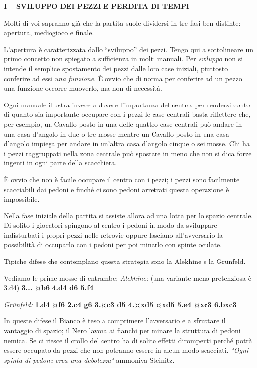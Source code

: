 \textbf{I -- SVILUPPO DEI PEZZI E PERDITA DI TEMPI}

Molti di voi sapranno già che la partita suole dividersi in tre fasi ben
distinte: apertura, mediogioco e finale.

L'apertura è caratterizzata dallo ``sviluppo'' dei pezzi. Tengo qui a
sottolineare un primo concetto non spiegato a sufficienza in molti
manuali. Per \emph{sviluppo} non si intende il semplice spostamento dei
pezzi dalle loro case iniziali, piuttosto conferire ad essi \emph{una
funzione}. È ovvio che di norma per conferire ad un pezzo una funzione
occorre muoverlo, ma non di necessità.

Ogni manuale illustra invece a dovere l'importanza del centro: per
rendersi conto di quanto sia importante occupare con i pezzi le case
centrali basta riflettere che, per esempio, un Cavallo posto in una
delle quattro case centrali può andare in una casa d'angolo in due o tre
mosse mentre un Cavallo posto in una casa d'angolo impiega per andare in
un'altra casa d'angolo cinque o sei mosse. Chi ha i pezzi raggruppati
nella zona centrale può spostare in meno che non si dica forze ingenti
in ogni parte della scacchiera.

È ovvio che non è facile occupare il centro con i pezzi; i pezzi sono
facilmente scacciabili dai pedoni e finché ci sono pedoni arretrati
questa operazione è impossibile.

Nella fase iniziale della partita si assiste allora ad una lotta per lo
spazio centrale. Di solito i giocatori spingono al centro i pedoni in
modo da sviluppare indisturbati i propri pezzi nelle retrovie oppure
lasciano all'avversario la possibilità di occuparlo con i pedoni per poi
minarlo con spinte oculate.

Tipiche difese che contemplano questa strategia sono la Alekhine e la
Grünfeld.

Vediamo le prime mosse di entrambe:
\newgame
\emph{Alekhine:}  (una variante meno
pretenziosa è 3.d4) \textbf{3... ¤b6 4.d4 d6 5.f4}


\emph{Grünfeld:} \textbf{1.d4 ¤f6 2.c4 g6 3.¤c3 d5 4.¤xd5 ¤xd5 5.e4 ¤xc3
6.bxc3}


In queste difese il Bianco è teso a comprimere l'avversario e a
sfruttare il vantaggio di spazio; il Nero lavora ai fianchi per minare
la struttura di pedoni nemica. Se ci riesce il crollo del centro ha di
solito effetti dirompenti perché potrà essere occupato da pezzi che non
potranno essere in alcun modo scacciati. \emph{"Ogni spinta di pedone
crea una debolezza"} ammoniva Steinitz.

